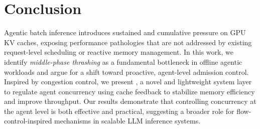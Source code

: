 \section{Conclusion}

Agentic batch inference introduces sustained and cumulative pressure on GPU KV caches, exposing performance pathologies that are not addressed by existing request-level scheduling or reactive memory management. In this work, we identify \emph{middle-phase thrashing} as a fundamental bottleneck in offline agentic workloads and argue for a shift toward proactive, agent-level admission control. Inspired by congestion control, we present \SysName{}, a novel and lightweight system layer to regulate agent concurrency using cache feedback to stabilize memory efficiency and improve throughput. Our results demonstrate that controlling concurrency at the agent level is both effective and practical, suggesting a broader role for flow-control-inspired mechanisms in scalable LLM inference systems.